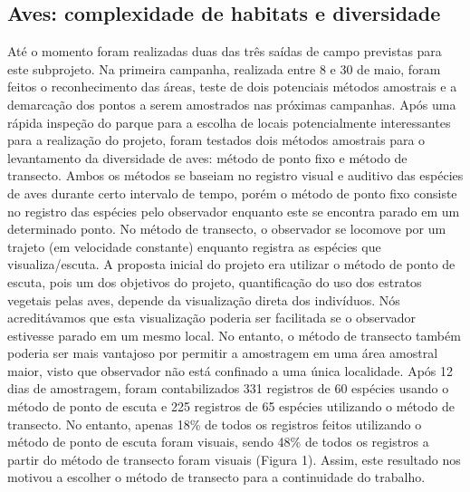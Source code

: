 \subsection{Aves: complexidade de habitats e diversidade} %
\label{sec:compl-de-habit} 


Até o momento foram realizadas duas das três saídas de campo previstas para este subprojeto. Na primeira campanha, realizada entre 8 e 30 de maio, foram feitos o reconhecimento das áreas, teste de dois potenciais métodos amostrais e a demarcação dos pontos a serem amostrados nas próximas campanhas. Após uma rápida inspeção do parque para a escolha de locais potencialmente interessantes para a realização do projeto, foram testados dois métodos amostrais para o levantamento da diversidade de aves: método de ponto fixo e método de transecto. Ambos os métodos se baseiam no registro visual e auditivo das espécies de aves durante certo intervalo de tempo, porém o método de ponto fixo consiste no registro das espécies pelo observador enquanto este se encontra parado em um determinado ponto. No método de transecto, o observador se locomove por um trajeto (em velocidade constante) enquanto registra as espécies que visualiza/escuta.
A proposta inicial do projeto era utilizar o método de ponto de escuta, pois um dos objetivos do projeto, quantificação do uso dos estratos vegetais pelas aves, depende da visualização direta dos indivíduos. Nós acreditávamos que esta visualização poderia ser facilitada se o observador estivesse parado em um mesmo local. No entanto, o método de transecto também poderia ser mais vantajoso por permitir a amostragem em uma área amostral maior, visto que observador não está confinado a uma única localidade. Após 12 dias de amostragem, foram contabilizados 331 registros de 60 espécies usando o método de ponto de escuta e 225 registros de 65 espécies utilizando o método de transecto. No entanto, apenas 18\% de todos os registros feitos utilizando o método de ponto de escuta foram visuais, sendo 48\% de todos os registros a partir do método de transecto foram visuais (Figura 1).
Assim, este resultado nos motivou a escolher o método de transecto para a continuidade do trabalho.